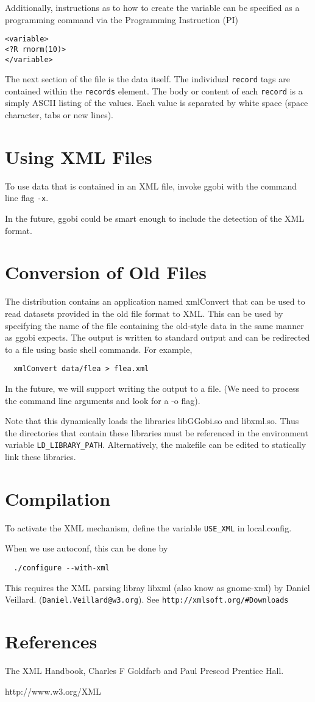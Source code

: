 \documentclass{article}
\begin{document}
Additionally, instructions as to how to create the variable can be
specified as a programming command via the Programming Instruction
(PI)
\begin{verbatim}
<variable>
<?R rnorm(10)>
</variable>
\end{verbatim}

The next section of the file is the data itself.  The individual
\texttt{record} tags are contained within the \texttt{records}
element.  The body or content of each \texttt{record} is a simply
ASCII listing of the values. Each value is separated
by white space (space character, tabs or new lines).


\section{Using XML Files}
To use data that is contained in an XML file, 
invoke ggobi with the command line flag
\texttt{-x}.

In the future, ggobi could be smart enough to include the detection of
the XML format.



\section{Conversion of Old Files}
The distribution contains an application named xmlConvert that can be
used to read datasets provided in the old file format to XML.  This
can be used by specifying the name of the file containing the
old-style data in the same manner as ggobi expects.
The output is written to standard output
and can be redirected to a file using basic shell commands.
For example,
\begin{verbatim}
  xmlConvert data/flea > flea.xml
\end{verbatim}
In the future, we will support writing the output to a file. (We need
to process the command line arguments and look for a -o flag).


Note that this dynamically loads the libraries libGGobi.so and
libxml.so.  Thus the directories that contain these libraries must be
referenced in the environment variable 
\texttt{LD_LIBRARY_PATH}.
Alternatively, the makefile can be edited to statically link these
libraries.


\section{Compilation}
To activate the XML mechanism, define the variable
\texttt{USE_XML} in  local.config.

When we use autoconf, this can be done by
\begin{verbatim}
  ./configure --with-xml
\end{verbatim}

This requires the XML parsing libray libxml (also know as gnome-xml) by Daniel Veillard.
(\texttt{Daniel.Veillard@w3.org}).
See \texttt{http://xmlsoft.org/#Downloads}
\section{References}
The XML Handbook, Charles F Goldfarb and Paul Prescod
 Prentice Hall.

http://www.w3.org/XML
\end{document}
